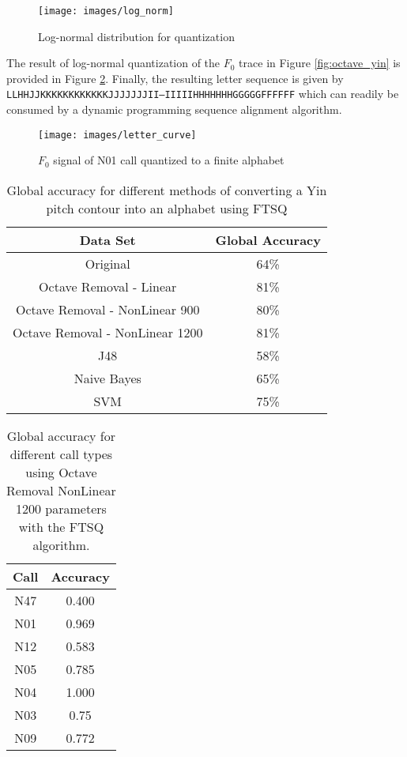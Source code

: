 \begin{figure}[h]
\centering
\texttt{[image: images/log\_norm]}
\caption{Log-normal distribution for quantization}
\label{fig:log_norm}
\end{figure}

The result of log-normal quantization of the $F_0$ trace in Figure
\ref{fig:octave_yin} is provided in Figure
\ref{fig:letter_curve}. Finally, the resulting letter sequence is
given by \texttt{LLHHJJKKKKKKKKKKKKJJJJJJJII--IIIIIHHHHHHHGGGGGFFFFFF}
which can readily be consumed by a dynamic programming sequence
alignment algorithm.

\begin{figure}[h]
\centering
\texttt{[image: images/letter\_curve]}
\caption{$F_0$ signal of N01 call quantized to a finite alphabet}
\label{fig:letter_curve}
\end{figure}

\begin{table}
\centering
\begin{tabular}{|c|c|} 
\hline
Data Set                         &  Global Accuracy  \\
\hline
Original                         &              64\%  \\
Octave Removal - Linear          &              81\%  \\
Octave Removal - NonLinear 900   &              80\%  \\
Octave Removal - NonLinear 1200  &              81\%  \\
J48                              &              58\%  \\
Naive Bayes                      &              65\%  \\
SVM                              &              75\%  \\
\hline
\end{tabular}
\caption{Global accuracy for different methods of converting a Yin
  pitch contour into an alphabet using FTSQ}
\label{table:performance}
\end{table}


\begin{table}
\centering
\begin{tabular}{|c|c|} 
\hline
 Call  &  Accuracy  \\
\hline
 N47   &     0.400  \\
 N01   &     0.969  \\
 N12   &     0.583  \\
 N05   &     0.785  \\
 N04   &     1.000  \\
 N03   &      0.75  \\
 N09   &     0.772  \\
\hline
\end{tabular}
\caption{Global accuracy for different call types using Octave Removal
  NonLinear 1200 parameters with the FTSQ algorithm.}
\label{table:performance}
\end{table}

